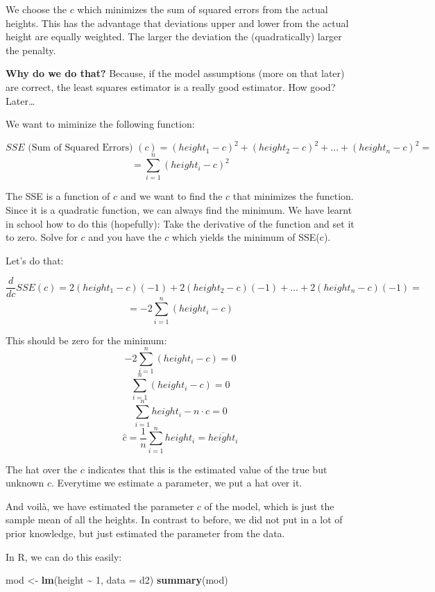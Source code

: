 \documentclass[
]{book}
\newenvironment{Shaded}{\begin{snugshade}}{\end{snugshade}}
\newcommand{\AttributeTok}[1]{\textcolor[rgb]{0.13,0.29,0.53}{#1}}
\newcommand{\DecValTok}[1]{\textcolor[rgb]{0.00,0.00,0.81}{#1}}
\newcommand{\FunctionTok}[1]{\textcolor[rgb]{0.13,0.29,0.53}{\textbf{#1}}}
\newcommand{\NormalTok}[1]{#1}
\newcommand{\OtherTok}[1]{\textcolor[rgb]{0.56,0.35,0.01}{#1}}
\newcommand{\SpecialCharTok}[1]{\textcolor[rgb]{0.81,0.36,0.00}{\textbf{#1}}}
\begin{document}
We choose the \(c\) which minimizes the sum of squared errors from the actual heights.
This has the advantage that deviations upper and lower from the actual height are
equally weighted. The larger the deviation the (quadratically) larger the penalty.

\textbf{Why do we do that?} Because, if the model assumptions (more on that later)
are correct, the least squares
estimator is a really good estimator. How good? Later\ldots{}

We want to miminize the following function:

\[ SSE \text{ (Sum of Squared Errors) }(c) = (height_1 - c)^2 + (height_2 - c)^2 + 
\ldots + (height_n - c)^2 =\]
\[ = \sum_{i=1}^{n} (height_i - c)^2\]

The SSE is a function of \(c\) and we want to find the \(c\) that minimizes the function.
Since it is a quadratic function, we can always find the minimum.
We have learnt in school how to do this (hopefully): Take the derivative of the function
and set it to zero. Solve for \(c\) and you have the \(c\) which yields the minimum of SSE(c).

Let's do that:

\[ \frac{d}{dc} SSE(c) =  2(height_1 - c)(-1) + 2(height_2 - c)(-1) + 
\ldots + 2(height_n - c)(-1) =\]
\[ = -2 \sum_{i=1}^{n} (height_i - c)\]

This should be zero for the minimum:
\[ -2 \sum_{i=1}^{n} (height_i - c) = 0\]
\[ \sum_{i=1}^{n} (height_i - c) = 0\]
\[ \sum_{i=1}^{n} height_i - n \cdot c = 0\]
\[ \hat{c} = \frac{1}{n} \sum_{i=1}^{n} height_i = \overline{height_i}\]

The hat over the \(c\) indicates that this is the estimated value of the
true but unknown \(c\).
Everytime we estimate a parameter, we put a hat over it.

And voilà, we have estimated the parameter \(c\) of the model, which is just the
sample mean of all the heights. In contrast to before, we did not put
in a lot of prior knowledge, but just estimated the parameter from the data.

In R, we can do this easily:

\begin{Shaded}
\begin{Highlighting}[]
\NormalTok{mod }\OtherTok{\textless{}{-}} \FunctionTok{lm}\NormalTok{(height }\SpecialCharTok{\textasciitilde{}} \DecValTok{1}\NormalTok{, }\AttributeTok{data =}\NormalTok{ d2)}
\FunctionTok{summary}\NormalTok{(mod)}
\end{Highlighting}
\end{Shaded}
\end{document}
